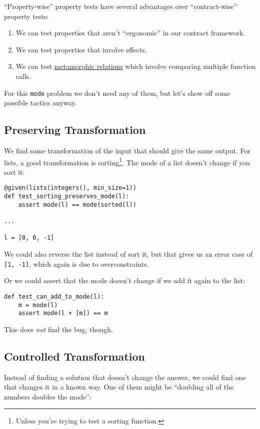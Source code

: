 ``Property-wise'' property tests have several advantages over
``contract-wise'' property tests:

\begin{enumerate}

\item
  We can test properties that aren't ``ergonomic'' in our contract
  framework.
\item
  We can test properties that involve effects.
\item
  We can test
  \href{https://www.hillelwayne.com/post/metamorphic-testing/}{metamorphic
  relations} which involve comparing multiple function calls.
\end{enumerate}
For this \texttt{mode} problem we don't need any of them, but let's show
off some possible tactics anyway.

\subsection{Preserving
Transformation}
\label{preserving-transformation}

We find some transformation of the input that should give the same
output. For lists, a good transformation is
sorting\footnote{Unless you're trying to test a sorting function.}.
The mode of a list doesn't change if you sort it:

\begin{verbatim}
@given(lists(integers(), min_size=1))
def test_sorting_preserves_mode(l):
    assert mode(l) == mode(sorted(l))

...

l = [0, 0, -1]
\end{verbatim}
We could also reverse the list instead of sort it, but that gives us an
error case of \texttt{{[}1,\ -1{]}}, which again is due to
overconstraints.

Or we could assert that the mode doesn't change if we add it again to
the list:

\begin{verbatim}
def test_can_add_to_mode(l):
    m = mode(l)
    assert mode(l + [m]) == m
\end{verbatim}
This does \emph{not} find the bug, though.

\subsection{Controlled
Transformation}
\label{controlled-transformation}

Instead of finding a solution that doesn't change the answer, we could
find one that changes it in a known way. One of them might be ``doubling
all of the numbers doubles the mode'':

